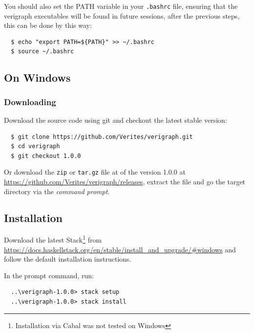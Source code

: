 \documentclass[12pt]{article}
\begin{document}
You should also set the PATH variable in your \texttt{.bashrc} file, ensuring that the verigraph executables will be found in future sessions, after the previous steps, this can be done by this way:

\begin{verbatim}
  $ echo "export PATH=${PATH}" >> ~/.bashrc
  $ source ~/.bashrc
\end{verbatim}

\subsection{On Windows}

\subsubsection{Downloading}
Download the source code using git and checkout the latest stable version:
\begin{verbatim}
  $ git clone https://github.com/Verites/verigraph.git
  $ cd verigraph
  $ git checkout 1.0.0
\end{verbatim}

\noindent
Or download the \texttt{zip} or \texttt{tar.gz} file at of the version 1.0.0 at \url{https://github.com/Verites/verigraph/releases}, extract the file and go the target directory via the \emph{command prompt}.

\subsection{Installation}

Download the latest Stack\footnote{Installation via Cabal was not tested on Windows} from \url{https://docs.haskellstack.org/en/stable/install_and_upgrade/#windows} and follow the default installation instructions.

In the prompt command, run:

\begin{verbatim}
  ..\verigraph-1.0.0> stack setup 
  ..\verigraph-1.0.0> stack install
\end{verbatim}


\end{document}
